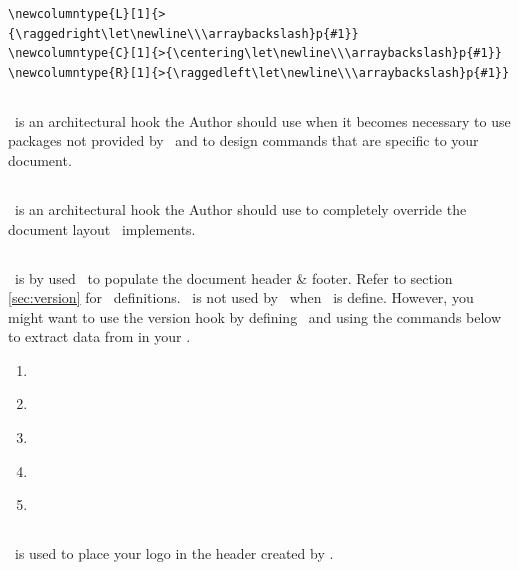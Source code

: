 \documentclass[12pt]{tlc-article}
\begin{document}
\begin{lstlisting}[basicstyle=\tiny]
\newcolumntype{L}[1]{>{\raggedright\let\newline\\\arraybackslash}p{#1}}
\newcolumntype{C}[1]{>{\centering\let\newline\\\arraybackslash}p{#1}}
\newcolumntype{R}[1]{>{\raggedleft\let\newline\\\arraybackslash}p{#1}}
\end{lstlisting}

\subsection{\tlcAL}
\tlcAL\ is an architectural hook the Author should use when it becomes necessary
to use packages not provided by \tlcA\, and to design commands that are specific
to your document.

\subsection{\tlcHF}
\tlcHF\ is an architectural hook the Author should use to completely override
the document layout \tlcA\ implements.

\subsection{\tlcVE}
\tlcVE\ is by used \tlcA\ to populate the document header \& footer.  Refer to
section \ref{sec:version} for \tlcVE\ definitions. \tlcVE\ is not
used by \tlcA\ when \tlcHF\ is define.  However, you might want to use the
version hook by defining \tlcVE\ and using the commands below to extract data
from \tlcVE in your \tlcHF.
\begin{enumerate}
  \item \tlcVC\
  \item \tlcDC\
  \item \tlcSC\
  \item \tlcIC\
  \item \tlcPC\
\end{enumerate}

\subsection{\tlcLG}
\tlcLG\ is used to place your logo in the header created by \tlcA. 
\end{document}
